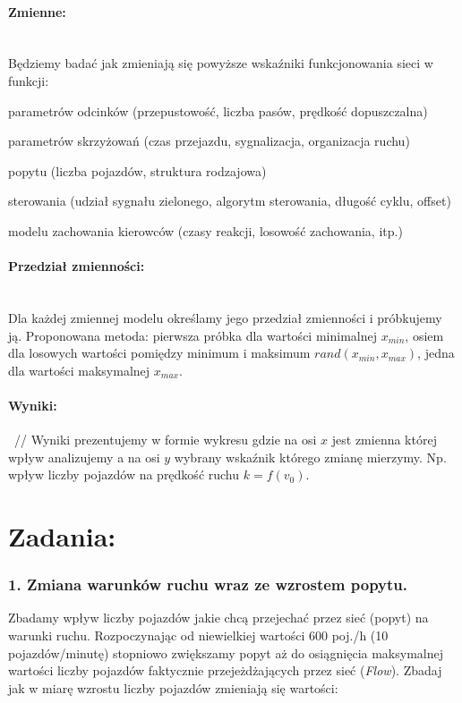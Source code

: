 \documentclass[11pt,a4paper]{article}
\begin{document}
\paragraph*{Zmienne:}
~\\
Będziemy badać jak zmieniają się powyższe wskaźniki funkcjonowania sieci w funkcji:
\begin{compactenum}
\item parametrów odcinków (przepustowość, liczba pasów, prędkość dopuszczalna)
\item parametrów skrzyżowań (czas przejazdu, sygnalizacja, organizacja ruchu)
\item popytu (liczba pojazdów, struktura rodzajowa)
\item sterowania (udział sygnału zielonego, algorytm sterowania, długość cyklu, offset)
\item modelu zachowania kierowców (czasy reakcji, losowość zachowania, itp.)
 \end{compactenum}
 

\paragraph*{Przedział zmienności:}
~\\
Dla każdej zmiennej modelu określamy jego przedział zmienności i próbkujemy ją. Proponowana metoda: pierwsza próbka dla wartości minimalnej $x_{min}$, osiem dla losowych wartości pomiędzy minimum i maksimum $rand(x_{min},x_{max})$, jedna dla wartości maksymalnej $x_{max}$.

\paragraph*{Wyniki:}
~//
Wyniki prezentujemy w formie wykresu gdzie na osi $x$ jest zmienna której wpływ analizujemy a na osi $y$ wybrany wskaźnik którego zmianę mierzymy. Np. wpływ liczby pojazdów na prędkość ruchu $k=f(v_0)$.

\section*{Zadania:}

\subsubsection{1. Zmiana warunków ruchu wraz ze wzrostem popytu.}
Zbadamy wpływ liczby pojazdów jakie chcą przejechać przez sieć (popyt) na warunki ruchu. Rozpoczynając od niewielkiej wartości 600 poj./h (10 pojazdów/minutę) stopniowo zwiększamy popyt aż do osiągnięcia maksymalnej wartości liczby pojazdów faktycznie przejeżdżających przez sieć (\textit{Flow}). Zbadaj jak w miarę wzrostu liczby pojazdów zmieniają się wartości:
\end{document}
